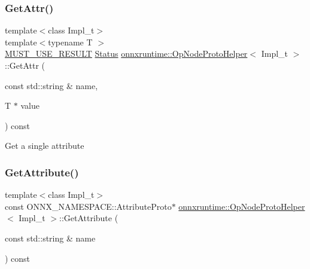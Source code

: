 \subsubsection{\texorpdfstring{Get\+Attr()}{GetAttr()}}
{\footnotesize\ttfamily template$<$class Impl\+\_\+t$>$ \\
template$<$typename T $>$ \\
\mbox{\hyperlink{op__node__proto__helper_8h_afefbce768b9d0df9c9ebc30dd6d13fed}{M\+U\+S\+T\+\_\+\+U\+S\+E\+\_\+\+R\+E\+S\+U\+LT}} \mbox{\hyperlink{classonnxruntime_1_1common_1_1Status}{Status}} \mbox{\hyperlink{classonnxruntime_1_1OpNodeProtoHelper}{onnxruntime\+::\+Op\+Node\+Proto\+Helper}}$<$ Impl\+\_\+t $>$\+::Get\+Attr (\begin{DoxyParamCaption}\item[{const std\+::string \&}]{name,  }\item[{T $\ast$}]{value }\end{DoxyParamCaption}) const}

Get a single attribute \mbox{\label{classonnxruntime_1_1OpNodeProtoHelper_a1cf9304aa856c38063b20b13f6fcbeb6}} 
\subsubsection{\texorpdfstring{Get\+Attribute()}{GetAttribute()}}
{\footnotesize\ttfamily template$<$class Impl\+\_\+t$>$ \\
const O\+N\+N\+X\+\_\+\+N\+A\+M\+E\+S\+P\+A\+C\+E\+::\+Attribute\+Proto$\ast$ \mbox{\hyperlink{classonnxruntime_1_1OpNodeProtoHelper}{onnxruntime\+::\+Op\+Node\+Proto\+Helper}}$<$ Impl\+\_\+t $>$\+::Get\+Attribute (\begin{DoxyParamCaption}\item[{const std\+::string \&}]{name }\end{DoxyParamCaption}) const\hspace{0.3cm}{\ttfamily [inline]}}

\mbox{\label{classonnxruntime_1_1OpNodeProtoHelper_ad6faae953b43361c87bcc09defb57f18}} 
